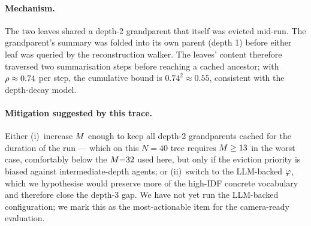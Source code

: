 \paragraph{Mechanism.}
The two leaves shared a depth-2 grandparent that itself was evicted
mid-run.  The grandparent's summary was folded into its own parent
(depth 1) before either leaf was queried by the reconstruction
walker.  The leaves' content therefore traversed two
summarisation steps before reaching a cached ancestor; with
$\rho \approx 0.74$ per step, the cumulative bound is
$0.74^2 \approx 0.55$, consistent with the depth-decay model.

\paragraph{Mitigation suggested by this trace.}
Either (i)~increase $M$ enough to keep all depth-2 grandparents
cached for the duration of the run --- which on this $N=40$ tree
requires $M \geq 13$ in the worst case, comfortably below the
$M{=}32$ used here, but only if the eviction priority is biased
against intermediate-depth agents; or (ii)~switch to the LLM-backed
$\varphi$, which we hypothesise would preserve more of the
high-IDF concrete vocabulary and therefore close the depth-3 gap.
We have not yet run the LLM-backed configuration; we mark this as
the most-actionable item for the camera-ready evaluation.


